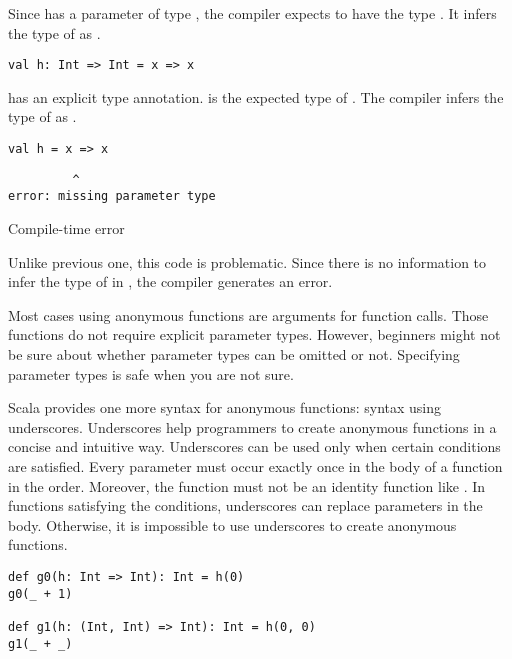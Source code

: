 Since  has a parameter of type , the compiler expects
 to have the type . It infers the type of  as
.

\begin{verbatim}
val h: Int => Int = x => x
\end{verbatim}

 has an explicit type annotation.  is the expected type of
. The compiler infers the type of  as .

\begin{verbatim}
val h = x => x
\end{verbatim}
\vspace{-1em}
\begin{mdframed}[hidealllines=true,backgroundcolor=red!10,innerleftmargin=3pt,innerrightmargin=3pt,leftmargin=-3pt,rightmargin=-3pt]
\begin{verbatim}
         ^
error: missing parameter type
\end{verbatim}
\vspace{-2em}
\begin{flushright}
\scriptsize\textsf{Compile-time error}
\end{flushright}
\end{mdframed}

Unlike previous one, this code is problematic. Since
there is no information to infer the type of  in ,
the compiler generates an error.

Most cases using anonymous functions are arguments for function calls.
Those functions do not require explicit parameter types. However, beginners might not
be sure about whether parameter types can be omitted or not. Specifying
parameter types is safe when you are not sure.

Scala provides one more syntax for anonymous functions: syntax using
underscores. Underscores help programmers to create anonymous functions in a
concise and intuitive way.
Underscores can be used only when certain conditions are satisfied.
Every parameter must occur exactly once in the body of a function in the
order. Moreover, the function must not be an identity function like .
In functions satisfying the conditions, underscores can replace parameters in the body.
Otherwise, it is impossible to use underscores to create anonymous functions.

\begin{verbatim}
def g0(h: Int => Int): Int = h(0)
g0(_ + 1)

def g1(h: (Int, Int) => Int): Int = h(0, 0)
g1(_ + _)
\end{verbatim}

